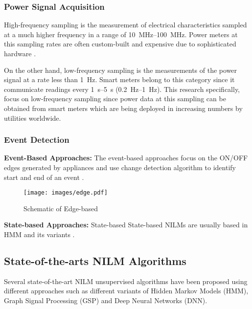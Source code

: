 \subsubsection{Power Signal Acquisition}

\lipsum[2]

High-frequency sampling is the measurement of electrical characteristics sampled at a much higher frequency in a range of \SIrange{10}{100}{\mega\hertz}. Power meters at this sampling rates are often custom-built and expensive due to sophisticated hardware \citep{Zoha2012}.

On the other hand, low-frequency sampling is the measurements of the power signal at a rate less than \SI{1}{\hertz}. Smart meters belong to this category since it communicate readings every \SIrange{1}{5}{\second} (\SIrange{0.2}{1}{\hertz}). This research specifically, focus on low-frequency sampling since power data at this sampling can be obtained from smart meters which are being deployed in increasing numbers by utilities worldwide.

\subsubsection{Event Detection}
\lipsum[1]

\textbf{Event-Based Approaches:} The event-based approaches focus on the ON/OFF edges generated by appliances and use change detection algorithm to identify start and end of an event \citep{Barsim2014,Wong2013}.

\lipsum[1]
\begin{figure}[ht]
	\centering
	\texttt{[image: images/edge.pdf]}
	\caption[Edge-based schematic ]{Schematic of Edge-based \citep{ZhaoyiKang2015}}
	\label{fig:edge}
\end{figure}

\textbf{State-based Approaches:} State-based  State-based NILMs are usually based in HMM and its variants \citep{Kim2011,Kolter2012,Parson2012,Makonin2015} .
\lipsum[2]


\subsection{State-of-the-arts NILM Algorithms}


Several state-of-the-art NILM unsupervised algorithms have been proposed using different approaches such as different variants of Hidden Markov Models (HMM), Graph Signal Processing (GSP) and Deep Neural Networks (DNN). 

